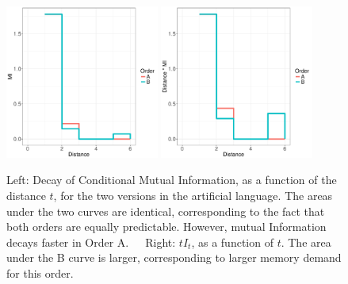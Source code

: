 \documentclass[11pt,letterpaper]{article}
\begin{document}
\begin{figure}
\includegraphics[width=0.45\textwidth]{toy/toy-mis.pdf}
\includegraphics[width=0.45\textwidth]{toy/toy-t-mis.pdf}
%
	\caption{Left: Decay of Conditional Mutual Information, as a function of the distance $t$, for the two versions in the artificial language. The areas under the two curves are identical, corresponding to the fact that both orders are equally predictable. However, mutual Information decays faster in Order A.\ \ \ Right: $t I_t$, as a function of $t$. The area under the B curve is larger, corresponding to larger memory demand for this order.}\label{fig:toy-mis}
\end{figure}
%
%
%
%
%
%
%
%
%
%
%
\end{document}
